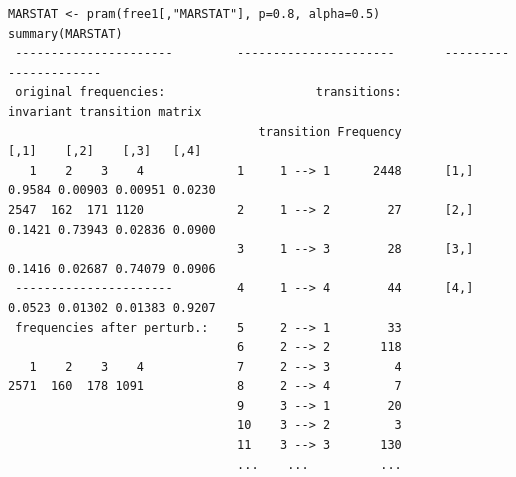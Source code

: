 \documentclass[12pt]{article}
\begin{document}
\begin{footnotesize}
\begin{verbatim}
MARSTAT <- pram(free1[,"MARSTAT"], p=0.8, alpha=0.5)
summary(MARSTAT)
 ----------------------         ----------------------       ----------------------
 original frequencies:				       transitions:	                invariant transition matrix
                                   transition Frequency             [,1]    [,2]    [,3]   [,4]
   1    2    3    4             1     1 --> 1      2448      [1,] 0.9584 0.00903 0.00951 0.0230
2547  162  171 1120             2     1 --> 2        27      [2,] 0.1421 0.73943 0.02836 0.0900
                                3     1 --> 3        28      [3,] 0.1416 0.02687 0.74079 0.0906
 ----------------------         4     1 --> 4        44      [4,] 0.0523 0.01302 0.01383 0.9207
 frequencies after perturb.:    5     2 --> 1        33
                                6     2 --> 2       118
   1    2    3    4             7     2 --> 3         4
2571  160  178 1091             8     2 --> 4         7
                                9     3 --> 1        20
                                10    3 --> 2         3
                                11    3 --> 3       130
                                ...    ...          ...
\end{verbatim}
\end{footnotesize}
\end{document}
